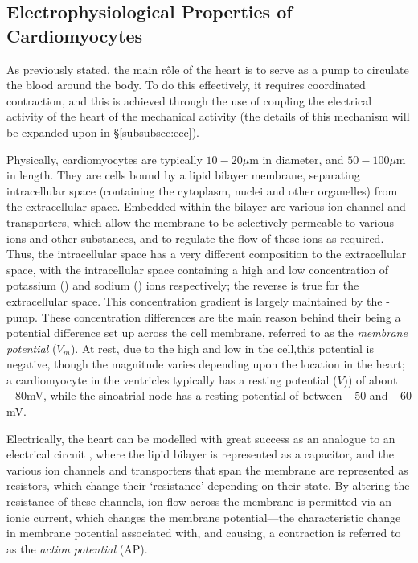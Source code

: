 \documentclass[../thesis-main.tex]{subfiles}
\begin{document}
 \subsection{Electrophysiological Properties of Cardiomyocytes}
 \label{subsec:electro-prop}
 As previously stated, the main r\^ole of the heart is to serve as a pump to circulate the blood around the body. To do this effectively, it requires coordinated contraction, and this is achieved through the use of coupling the electrical activity of the heart of the mechanical activity (the details of this mechanism will be expanded upon in \S\ref{subsubsec:ecc}).
 
 Physically, cardiomyocytes are typically $10-20\mu$m in diameter, and $50-100\mu$m in length. They are cells bound by a lipid bilayer membrane, separating intracellular space (containing the cytoplasm, nuclei and other organelles) from the extracellular space. Embedded within the bilayer are various ion channel and transporters, which allow the membrane to be selectively permeable to various ions and other substances, and to regulate the flow of these ions as required. Thus, the intracellular space has a very different composition to the extracellular space, with the intracellular space containing a high and low concentration of potassium (\K) and sodium (\na) ions respectively; the reverse is true for the extracellular space. This concentration gradient is largely maintained by the \na-\K{} pump. These concentration differences are the main reason behind their being a potential difference set up across the cell membrane, referred to as the \emph{membrane potential} ($V_m$). At rest, due to the high \K{} and low \na{} in the cell,this potential is negative, though the magnitude varies depending upon the location in the heart; a cardiomyocyte in the ventricles typically has a resting potential ($V$)) of about $-80$mV, while the sinoatrial node has a resting potential of between $-50$ and $-60$mV.
 
 Electrically, the heart can be modelled with great success as an analogue to an electrical circuit \citep{Carmeliet2002}, where the lipid bilayer is represented as a capacitor, and the various ion channels and transporters that span the membrane are represented as resistors, which change their `resistance' depending on their state. By altering the resistance of these channels, ion flow across the membrane is permitted via an ionic current, which changes the membrane potential---the characteristic change in membrane potential associated with, and causing, a contraction is referred to as the \emph{action potential} (AP).
 
\end{document}

